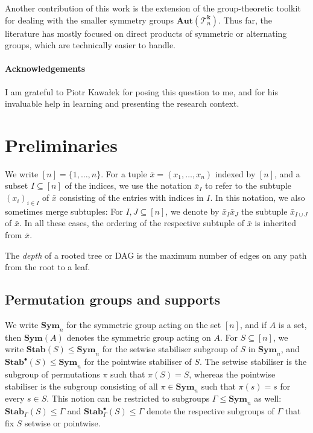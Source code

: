 \documentclass[11pt]{article}
\newcommand{\Aut}{\mathbf{Aut}}
\newcommand{\Sym}{\mathbf{Sym}}
\newcommand{\Stab}{\mathbf{Stab}}
\newcommand{\StabP}{\mathbf{Stab}^{\bullet}}
\newcommand{\Tt}{{\mathcal T}}
\theoremstyle{definition}
\theoremstyle{plain}
\theoremstyle{remark}
\theoremstyle{remark}
\begin{document}
 Another contribution of this work is the extension of the group-theoretic toolkit for dealing with the smaller symmetry groups $\Aut(\Tt_n^{\boldsymbol{k}})$. Thus far, the literature has mostly focused on direct products of symmetric or alternating groups, which are technically easier to handle. 
 
\paragraph*{Acknowledgements}
I am grateful to Piotr Kawa\l ek for posing this question to me, and for his invaluable help in learning and presenting the research context.




\section{Preliminaries}
\label{sec:preliminaries}
We write $[n] = \{1, \dots, n\}$.
For a tuple $\bar{x} = (x_1, \dots, x_n)$ indexed by $[n]$, and a subset $I \subseteq [n]$ of the indices, we use the notation $\bar{x}_I$ to refer to the subtuple $(x_i)_{i \in I}$ of $\bar{x}$ consisting of the entries with indices in $I$. 
In this notation, we also sometimes merge subtuples:
For $I, J \subseteq [n]$, we denote by $\bar{x}_I\bar{x}_J$ the subtuple $\bar{x}_{I \cup J}$ of $\bar{x}$. In all these cases, the ordering of the respective subtuple of $\bar{x}$ is inherited from $\bar{x}$.

The \emph{depth} of a rooted tree or DAG is the maximum number of edges on any path from the root to a leaf.


\subsection{Permutation groups and supports}
\label{sec:permGroups}
We write $\Sym_n$ for the symmetric group acting on the set $[n]$, and if $A$ is a set, then $\Sym(A)$ denotes the symmetric group acting on $A$.
For $S \subseteq [n]$, we write $\Stab(S) \leq \Sym_n$ for the setwise stabiliser subgroup of $S$ in $\Sym_n$, and $\StabP(S) \leq \Sym_n$ for the pointwise stabiliser of $S$. The setwise stabiliser is the subgroup of permutations $\pi$ such that $\pi(S) = S$, whereas the pointwise stabiliser is the subgroup consisting of all $\pi \in \Sym_n$ such that $\pi(s) = s$ for every $s \in S$.
This notion can be restricted to subgroups $\Gamma \leq \Sym_n$ as well: $\Stab_\Gamma(S) \leq \Gamma$ and $\StabP_\Gamma(S) \leq \Gamma$ denote the respective subgroups of $\Gamma$ that fix $S$ setwise or pointwise.
\end{document}
